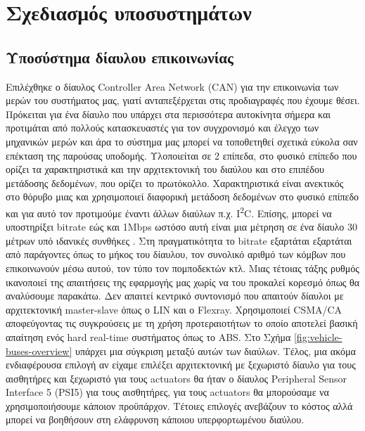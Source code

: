 \documentclass{article}
\begin{document}
\section{Σχεδιασμός υποσυστημάτων}

\subsection{Υποσύστημα δίαυλου επικοινωνίας}
Επιλέχθηκε ο δίαυλος Controller Area Network (CAN) \cite{can20} για την επικοινωνία των μερών του συστήματος μας, γιατί ανταπεξέρχεται στις προδιαγραφές που έχουμε θέσει. Πρόκειται για ένα δίαυλο που υπάρχει στα περισσότερα αυτοκίνητα σήμερα και προτιμάται από πολλούς κατασκευαστές για τον συγχρονισμό και έλεγχο των μηχανικών μερών και άρα το σύστημα μας μπορεί να τοποθετηθεί σχετικά εύκολα σαν επέκταση της παρούσας υποδομής. Υλοποιείται σε 2 επίπεδα, στο φυσικό επίπεδο που ορίζει τα χαρακτηριστικά και την αρχιτεκτονική του διαύλου και στο επιπέδου μετάδοσης δεδομένων, που ορίζει το πρωτόκολλο. Χαρακτηριστικά είναι ανεκτικός στο θόρυβο μιας και χρησιμοποιεί διαφορική μετάδοση δεδομένων στο φυσικό επίπεδο και για αυτό τον προτιμούμε έναντι άλλων διαύλων π.χ. I\textsuperscript{2}C. Επίσης, μπορεί να υποστηρίξει bitrate εώς και 1Mbps ωστόσο αυτή είναι μια μέτρηση σε ένα δίαυλο 30 μέτρων υπό ιδανικές συνθήκες \cite{canreq:20}. Στη πραγματικότητα το bitrate εξαρτάται εξαρτάται από παράγοντες όπως το μήκος του δίαυλου, τον συνολικό αριθμό των κόμβων που επικοινωνούν μέσω αυτού, τον τύπο τον πομποδεκτών κτλ. Μιας τέτοιας τάξης ρυθμός ικανοποιεί της απαιτήσεις της εφαρμογής μας χωρίς να του προκαλεί κορεσμό όπως θα αναλύσουμε παρακάτω. Δεν απαιτεί κεντρικό συντονισμό που απαιτούν δίαυλοι με αρχιτεκτονική master-slave όπως ο LIN και ο Flexray. Χρησιμοποιεί CSMA/CA αποφεύγοντας τις συγκρούσεις με τη χρήση προτεραιοτήτων το οποίο αποτελεί βασική απαίτηση ενός hard real-time συστήματος όπως το ABS. Στο Σχήμα \ref{fig:vehicle-buses-overview} υπάρχει μια σύγκριση μεταξύ αυτών των διαύλων. Τέλος, μια ακόμα ενδιαφέρουσα επιλογή αν είχαμε επιλέξει αρχιτεκτονική με ξεχωριστό δίαυλο για τους αισθητήρες και ξεχωριστό για τους actuators θα ήταν ο δίαυλος Peripheral Sensor Interface 5 (PSI5) για τους αισθητήρες, για τους actuators θα μπορούσαμε να χρησιμοποιήσουμε κάποιον προϋπάρχον. Τέτοιες επιλογές ανεβάζουν το κόστος αλλά μπορεί να βοηθήσουν στη ελάφρυνση κάποιου υπερφορτωμένου διαύλου.
\par
\end{document}
